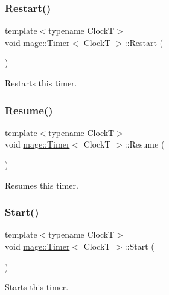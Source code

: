 \subsubsection{\texorpdfstring{Restart()}{Restart()}}
{\footnotesize\ttfamily template$<$typename ClockT$>$ \\
void \mbox{\hyperlink{classmage_1_1_timer}{mage\+::\+Timer}}$<$ ClockT $>$\+::Restart (\begin{DoxyParamCaption}{ }\end{DoxyParamCaption})\hspace{0.3cm}{\ttfamily [noexcept]}}

Restarts this timer. \mbox{\label{classmage_1_1_timer_a8464b2ea3fb3d97eac5ccb3a5b02e47b}} 
\subsubsection{\texorpdfstring{Resume()}{Resume()}}
{\footnotesize\ttfamily template$<$typename ClockT$>$ \\
void \mbox{\hyperlink{classmage_1_1_timer}{mage\+::\+Timer}}$<$ ClockT $>$\+::Resume (\begin{DoxyParamCaption}{ }\end{DoxyParamCaption})\hspace{0.3cm}{\ttfamily [noexcept]}}

Resumes this timer. \mbox{\label{classmage_1_1_timer_a633908e9e816e9397cd93b65bc11ddb3}} 
\subsubsection{\texorpdfstring{Start()}{Start()}}
{\footnotesize\ttfamily template$<$typename ClockT$>$ \\
void \mbox{\hyperlink{classmage_1_1_timer}{mage\+::\+Timer}}$<$ ClockT $>$\+::Start (\begin{DoxyParamCaption}{ }\end{DoxyParamCaption})\hspace{0.3cm}{\ttfamily [noexcept]}}

Starts this timer. \mbox{\label{classmage_1_1_timer_ab9442d64c2c1bedec830004f292725ab}} 
